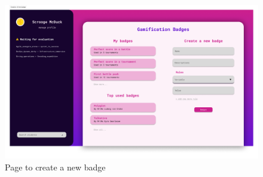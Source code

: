\begin{figure}[H]
    \centering
    \includegraphics[width=1\textwidth]{images/user_interfaces/new_badge.png}
    \caption{Page to create a new badge}
\end{figure}

